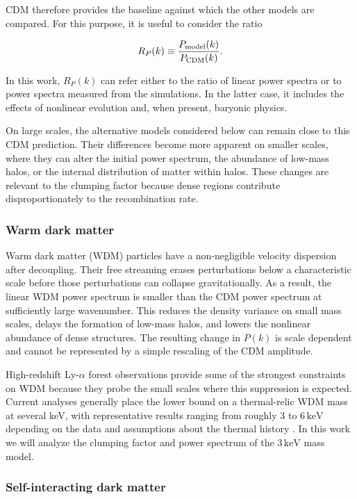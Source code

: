 CDM therefore provides the baseline against which the other models are compared. For this purpose, it is useful to consider the ratio

$$
R_P(k) \equiv \frac{P_{\rm model}(k)}{P_{\rm CDM}(k)}.
$$

In this work, $R_P(k)$ can refer either to the ratio of linear power spectra or to power spectra measured from the simulations. In the latter case, it includes the effects of nonlinear evolution and, when present, baryonic physics.

On large scales, the alternative models considered below can remain close to this CDM prediction. Their differences become more apparent on smaller scales, where they can alter the initial power spectrum, the abundance of low-mass halos, or the internal distribution of matter within halos. These changes are relevant to the clumping factor because dense regions contribute disproportionately to the recombination rate.

\subsubsection{Warm dark matter}

Warm dark matter (WDM) particles have a non-negligible velocity dispersion after decoupling. Their free streaming erases perturbations below a characteristic scale before those perturbations can collapse gravitationally. As a result, the linear WDM power spectrum is smaller than the CDM power spectrum at sufficiently large wavenumber. This reduces the density variance on small mass scales, delays the formation of low-mass halos, and lowers the nonlinear abundance of dense structures. The resulting change in $P(k)$ is scale dependent and cannot be represented by a simple rescaling of the CDM amplitude.

High-redshift Ly-$\alpha$ forest observations provide some of the strongest constraints on WDM because they probe the small scales where this suppression is expected. Current analyses generally place the lower bound on a thermal-relic WDM mass at several keV, with representative results ranging from roughly $3$ to $6\,\mathrm{keV}$ depending on the data and assumptions about the thermal history \cite{irsic2024wdm,villasenor2022wdm}. In this work we will analyze the clumping factor and power spectrum of the $3\,\mathrm{keV}$ mass model.


\subsubsection{Self-interacting dark matter}


